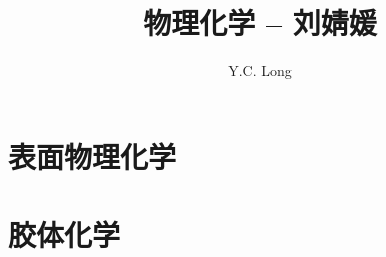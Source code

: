 \documentclass[a4paper]{ctexrep}
\author{Y.C. Long}
\title{物理化学 -- 刘婧媛}
\begin{document}
\maketitle
\tableofcontents





\chapter{表面物理化学}
\chapter{胶体化学}
\end{document}

